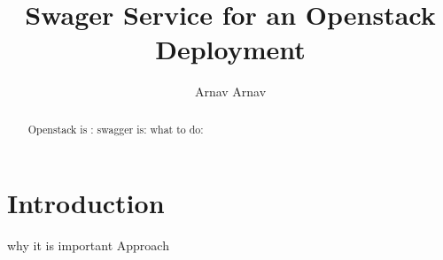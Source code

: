 
\title{Swager Service for an Openstack Deployment}


\author{Arnav Arnav}


\renewcommand{\shortauthors}{Arnav}


\begin{abstract}
Openstack is :
swagger is:
what to do:
\end{abstract}



\maketitle

\section{Introduction}
why it is important
Approach
